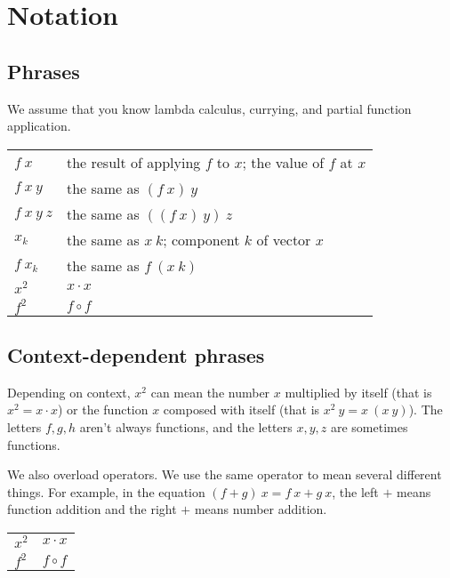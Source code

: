 \chapter{Notation}

\section{Phrases}

We assume that you know lambda calculus, currying, and partial function application.

\begin{center}
    \begin{tabular}{ll}
        \(f~x\) & the result of applying \(f\) to \(x\); the value of \(f\) at \(x\)
        \\
        \(f~x~y\) & the same as \((f~x)~y\)
        \\
        \(f~x~y~z\) & the same as \(((f~x)~y)~z\)
        \\
        \(x_k\) & the same as \(x~k\); component \(k\) of vector \(x\)
        \\
        \(f~x_k\) & the same as \(f~(x~k)\)
        \\
        \(x^2\) & \(x \cdot x\)
        \\
        \(f^2\) & \(f \circ f\)
    \end{tabular}
\end{center}

\section{Context-dependent phrases}

Depending on context,
\(x^2\) can mean the number \(x\) multiplied by itself
(that is \(x^2 = x \cdot x\))
or the function \(x\) composed with itself (that is \(x^2~y = x~(x~y)\)).
The letters \(f,g,h\) aren't always functions,
and the letters \(x,y,z\) are sometimes functions.

We also overload operators.
We use the same operator to mean
several different things.
For example, in the equation \((f + g)~x = f~x + g~x\),
the left \(+\) means function addition and the right \(+\) means number addition.

\begin{center}
    \begin{tabular}{ll}
        \(x^2\) & \(x \cdot x\)
        \\
        \(f^2\) & \(f \circ f\)
    \end{tabular}
\end{center}

